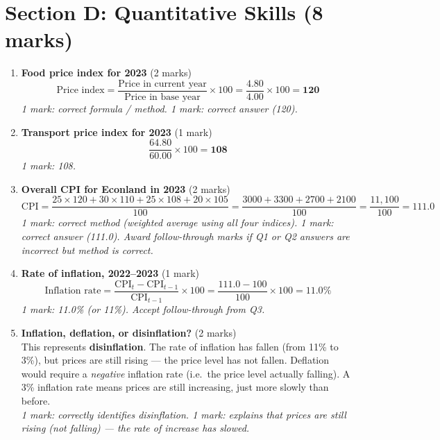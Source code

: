 \documentclass[12pt,a4paper]{article}
\begin{document}
\newpage

\section*{Section D: Quantitative Skills (8 marks)}

\begin{enumerate}[leftmargin=*, label=\textbf{\arabic*.}]

    \item \textbf{Food price index for 2023} \hfill (2 marks)
    \[
        \text{Price index} = \frac{\text{Price in current year}}{\text{Price in base year}} \times 100
        = \frac{4.80}{4.00} \times 100 = \mathbf{120}
    \]
    \textit{1 mark: correct formula / method. 1 mark: correct answer (120).}

    \vspace{0.5em}

    \item \textbf{Transport price index for 2023} \hfill (1 mark)
    \[
        \frac{64.80}{60.00} \times 100 = \mathbf{108}
    \]
    \textit{1 mark: 108.}

    \vspace{0.5em}

    \item \textbf{Overall CPI for Econland in 2023} \hfill (2 marks)
    \[
        \text{CPI} = \frac{25 \times 120 + 30 \times 110 + 25 \times 108 + 20 \times 105}{100}
        = \frac{3000 + 3300 + 2700 + 2100}{100}
        = \frac{11{,}100}{100} = \mathbf{111.0}
    \]
    \textit{1 mark: correct method (weighted average using all four indices). 1 mark: correct answer (111.0). Award follow-through marks if Q1 or Q2 answers are incorrect but method is correct.}

    \vspace{0.5em}

    \item \textbf{Rate of inflation, 2022--2023} \hfill (1 mark)
    \[
        \text{Inflation rate} = \frac{\text{CPI}_t - \text{CPI}_{t-1}}{\text{CPI}_{t-1}} \times 100
        = \frac{111.0 - 100}{100} \times 100 = \mathbf{11.0\%}
    \]
    \textit{1 mark: 11.0\% (or 11\%). Accept follow-through from Q3.}

    \vspace{0.5em}

    \item \textbf{Inflation, deflation, or disinflation?} \hfill (2 marks)\\
    This represents \textbf{disinflation}. The rate of inflation has fallen (from 11\% to 3\%), but prices are still rising --- the price level has not fallen. Deflation would require a \textit{negative} inflation rate (i.e.\ the price level actually falling). A 3\% inflation rate means prices are still increasing, just more slowly than before.\\
    \textit{1 mark: correctly identifies disinflation. 1 mark: explains that prices are still rising (not falling) --- the rate of increase has slowed.}

\end{enumerate}
\end{document}
